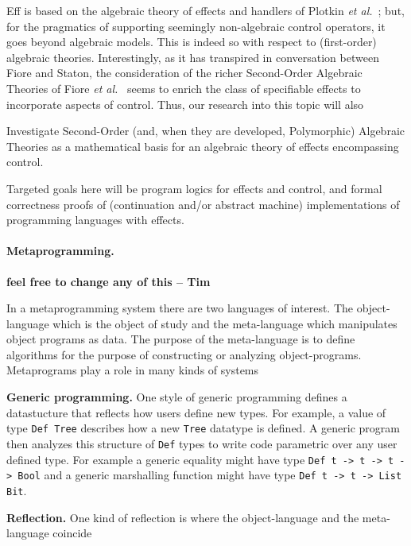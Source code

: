 \documentclass[11pt,twocolumn]{article}
\newcounter{CC}
\newenvironment{resenumerate}
  {\begin{list}{[\textbf{\arabic{CC}]}}
  {\usecounter{CC}
   \setlength{\topsep}{2pt}
   \setlength{\partopsep}{2pt}
   \setlength{\itemsep}{2.5pt}
   \setlength{\parsep}{2.5pt}
   \setlength{\leftmargin}{1.65em}
   \setlength{\labelwidth}{1.15em}
 }}
  {\end{list}}
\newcommand{\hide}[1]{}
\newcommand{\hidenote}{\hide}
\newcommand{\etal}{\emph{et al.}}
\begin{document}
Eff is based on the algebraic theory of effects and handlers of Plotkin
\etal~\cite{PlotkinPowerAlgOpsAndGenEffs,PlotkinPretnar};
but, for the pragmatics of supporting seemingly non-algebraic control
operators, it goes beyond algebraic models.  This is indeed so with
respect to (first-order) algebraic theories.  Interestingly, as it has
transpired in conversation between Fiore and Staton, the consideration of
the richer Second-Order Algebraic Theories of Fiore
\etal~\cite{FioreHur,FioreMahmoud} seems to enrich the class of
specifiable effects to incorporate aspects of control.  Thus, our research
into this topic will also
\begin{resenumerate}\setcounter{CC}{5}
\item
  Investigate Second-Order (and, when they are developed, Polymorphic)
  Algebraic Theories as a mathematical basis for an algebraic theory of
  effects encompassing control.
\end{resenumerate}
Targeted goals here will be program logics for effects and control, and formal
correctness proofs of (continuation and/or abstract machine) implementations
of programming languages with effects.

\hidenote{Dependent CBPV}

\paragraph{Metaprogramming.}
\label{MetaprogrammingParagraph}
{\bf feel free to change any of this -- Tim}

In a metaprogramming system there are two languages of interest. The
object-language which is the object of study and the meta-language which
manipulates object programs as data. The purpose of the meta-language is
to define algorithms for the purpose of constructing or analyzing
object-programs. Metaprograms play a role in many kinds of systems

{\bf Generic programming.}
One style of generic programming defines a datastucture that reflects how
users define new types. For example, a value of type \verb+Def Tree+
describes how a new \verb+Tree+ datatype is defined. A generic program then
analyzes this structure of \verb+Def+ types to write code parametric over
any user defined type. For example a generic equality might have type
\verb+Def t -> t -> t -> Bool+ and a generic marshalling function
might have type \verb+Def t -> t -> List Bit+. 

{\bf Reflection.} One kind of reflection is where the object-language and the meta-language
coincide
\end{document}
